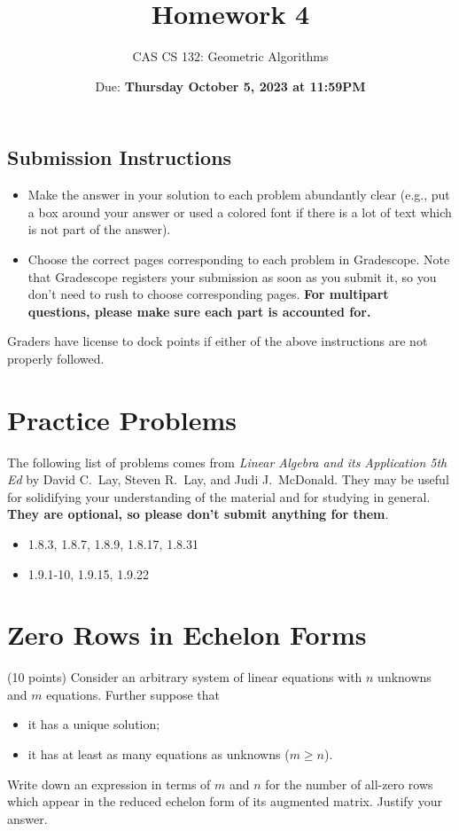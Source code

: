 \documentclass{article}
\title{
  Homework 4
}
\author{CAS CS 132: Geometric Algorithms}
\date{Due: \textbf{Thursday October 5, 2023 at 11:59PM}}
\theoremstyle{remark}
\begin{document}
\maketitle

\subsection*{Submission Instructions}
\begin{itemize}
\item Make the answer in your solution to each problem abundantly clear (e.g., put a box around your answer or used a colored font if there is a lot of text which is not part of the answer).
\item Choose the correct pages corresponding to each problem in Gradescope. Note that Gradescope registers your submission as soon as you submit it, so you don't need to rush to choose corresponding pages.
  \textbf{For multipart questions, please make sure each part is accounted for.}
\end{itemize}
Graders have license to dock points if either of the above instructions are not properly followed.


\section*{Practice Problems}

The following list of problems comes from \textit{Linear Algebra and its Application 5th Ed} by David C.\ Lay, Steven R.\ Lay, and Judi J.\ McDonald.
They may be useful for solidifying your understanding of the material and for studying in general.
\textbf{They are optional, so please don't submit anything for them}.

\begin{itemize}
\item 1.8.3, 1.8.7, 1.8.9, 1.8.17, 1.8.31
\item 1.9.1-10, 1.9.15, 1.9.22
\end{itemize}

\pagebreak
\section{Zero Rows in Echelon Forms}
(10 points) Consider an arbitrary system of linear equations with $n$ unknowns and $m$ equations.
Further suppose that
\begin{itemize}
\item it has a unique solution;
\item it has at least as many equations as unknowns ($m \geq n$).
\end{itemize}
Write down an expression in terms of $m$ and $n$ for the number of all-zero rows which appear in the reduced echelon form of its augmented matrix.
Justify your answer.
\end{document}
